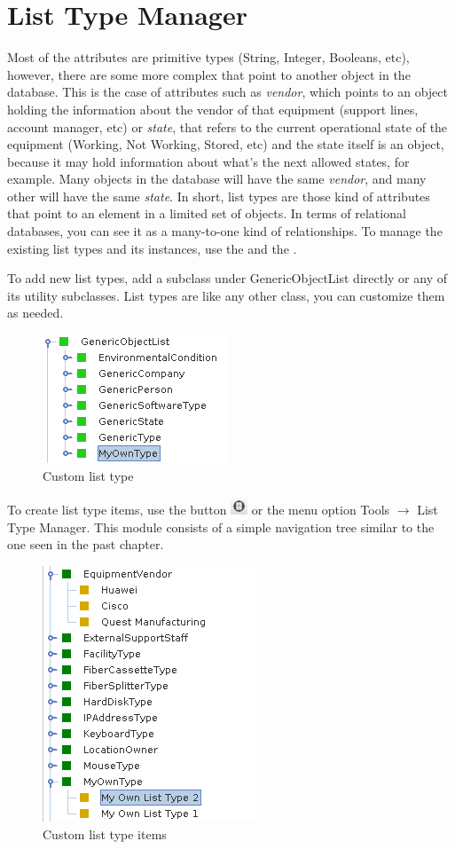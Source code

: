 \documentclass[a4paper]{article}
\begin{document}
	\newpage
	\section{List Type Manager} \label{sec:list_type_manager}
	Most of the attributes are primitive types (String, Integer, Booleans, etc), however, there are some more complex that point to another object in the database. This is the case of attributes such as \textit{vendor}, which points to an object holding the information about the vendor of that equipment (support lines, account manager, etc) or \textit{state}, that refers to the current operational state of the equipment (Working, Not Working, Stored, etc) and the state itself is an object, because it may hold information about what's the next allowed states, for example. Many objects in the database will have the same \textit{vendor}, and many other will have the same \textit{state}. In short, list types are those kind of attributes that point to an element in a limited set of objects. In terms of relational databases, you can see it as a many-to-one kind of relationships. To manage the existing list types and its instances, use the \textbf{} and the \textbf{}. \newline
	
	To add new list types, add a subclass under GenericObjectList directly or any of its utility subclasses. List types are like any other class, you can customize them as needed.
	\begin{figure}[h!]
		\centering
		\includegraphics[width=0.3\linewidth]{img/list_type_own_type.png}
		\caption{Custom list type}
		\label{fig:list_type_own_type}
	\end{figure}
	 To create list type items, use the button \includegraphics[width=0.5cm]{img/icon_list_type_manager.png} or the menu option Tools $\rightarrow$ List Type Manager. This module consists of a simple navigation tree similar to the one seen in the past chapter.
	 \begin{figure}[h!]
	 	\centering
	 	\includegraphics[width=0.3\linewidth]{img/list_type_list_type_items.png}
	 	\caption{Custom list type items}
	 	\label{fig:list_type_list_type_items}
	 \end{figure}
	 
\end{document}
